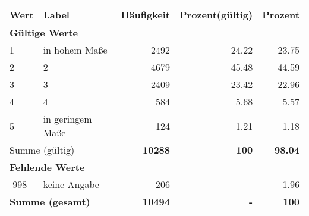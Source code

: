      \begin{longtable}{lXrrr}
     \toprule
     \textbf{Wert} & \textbf{Label} & \textbf{Häufigkeit} & \textbf{Prozent(gültig)} & \textbf{Prozent} \\
     \endhead
     \midrule
     \multicolumn{5}{l}{\textbf{Gültige Werte}}\\

     1 &
     \multicolumn{1}{X}{ in hohem Maße   } &


       \num{2492} &
       \num[round-mode=places,round-precision=2]{24,22} &
         \num[round-mode=places,round-precision=2]{23,75} \\

     2 &
     \multicolumn{1}{X}{ 2   } &


       \num{4679} &
       \num[round-mode=places,round-precision=2]{45,48} &
         \num[round-mode=places,round-precision=2]{44,59} \\

     3 &
     \multicolumn{1}{X}{ 3   } &


       \num{2409} &
       \num[round-mode=places,round-precision=2]{23,42} &
         \num[round-mode=places,round-precision=2]{22,96} \\

     4 &
     \multicolumn{1}{X}{ 4   } &


       \num{584} &
       \num[round-mode=places,round-precision=2]{5,68} &
         \num[round-mode=places,round-precision=2]{5,57} \\

     5 &
     \multicolumn{1}{X}{ in geringem Maße   } &


       \num{124} &
       \num[round-mode=places,round-precision=2]{1,21} &
         \num[round-mode=places,round-precision=2]{1,18} \\
     \midrule
     \multicolumn{2}{l}{Summe (gültig)} &
       \textbf{\num{10288}} &
     \textbf{100} &
       \textbf{\num[round-mode=places,round-precision=2]{98,04}} \\
     \multicolumn{5}{l}{\textbf{Fehlende Werte}}\\
       -998 &
       keine Angabe &
         \num{206} &
        - &
         \num[round-mode=places,round-precision=2]{1,96} \\
     \midrule
     \multicolumn{2}{l}{\textbf{Summe (gesamt)}} &
          \textbf{\num{10494}} &
        \textbf{-} &
        \textbf{100} \\
     \bottomrule
     \end{longtable}
     
